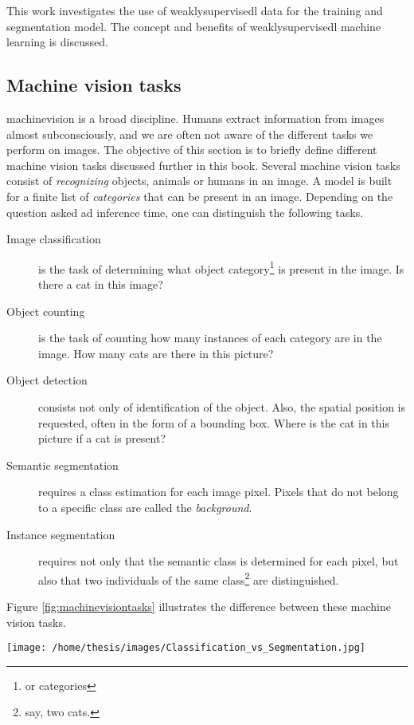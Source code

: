 This work investigates the use of \Gls{weaklysupervisedl} data for the training and segmentation model. 
The concept and benefits of \Gls{weaklysupervisedl} machine learning is discussed.

\subsection{Machine vision tasks \label{sec:machinevisiontasks}}

\Gls{machinevision} is a broad discipline. 
Humans extract information from images almost subconsciously, and we are often not aware of the different tasks we perform on images.
The objective of this section is to briefly define different machine vision tasks discussed further in this book. 
Several machine vision tasks consist of \textit{recognizing} objects, animals or humans in an image.
A model is built for a finite list of \textit{categories} that can be present in an image.
Depending on the question asked ad inference time, one can distinguish the following tasks.

\begin{description}
    \item[Image classification] is the task of determining what object category\footnote{or categories} is present in the image. Is there a cat in this image?
    \item[Object counting] is the task of counting how many instances of each category are in the image. How many cats are there in this picture? 
    \item[Object detection] consists not only of identification of the object. Also, the spatial position is requested, often in the form of a bounding box. Where is the cat in this picture if a cat is present?
    \item[Semantic segmentation] requires a class estimation for each image pixel. Pixels that do not belong to a specific class are called the \textit{background}.
    \item[Instance segmentation] requires not only that the semantic class is determined for each pixel, but also that two individuals of the same class\footnote{say, two cats.} are distinguished.   
\end{description}

Figure \ref{fig:machinevisiontasks} illustrates the difference between these machine vision tasks. 

\begin{SCfigure}[][h!]
    \centering
    \texttt{[image: /home/thesis/images/Classification\_vs\_Segmentation.jpg]}
    \caption{Illustration to compare different Machine vision tasks \cite{SemTorch76:online}. 
    Object detection means that the location of several objects is estimated by the model. This is indicated by the \textit{bounding boxes}.
    Segmentation of an image is classifying each pixel in the correct class or assigning it to the \textit{background} class.
    Semantic segmentation makes no difference between different instances of the same semantic class, instance segmentation does.
    \label{fig:machinevisiontasks}}
\end{SCfigure}

